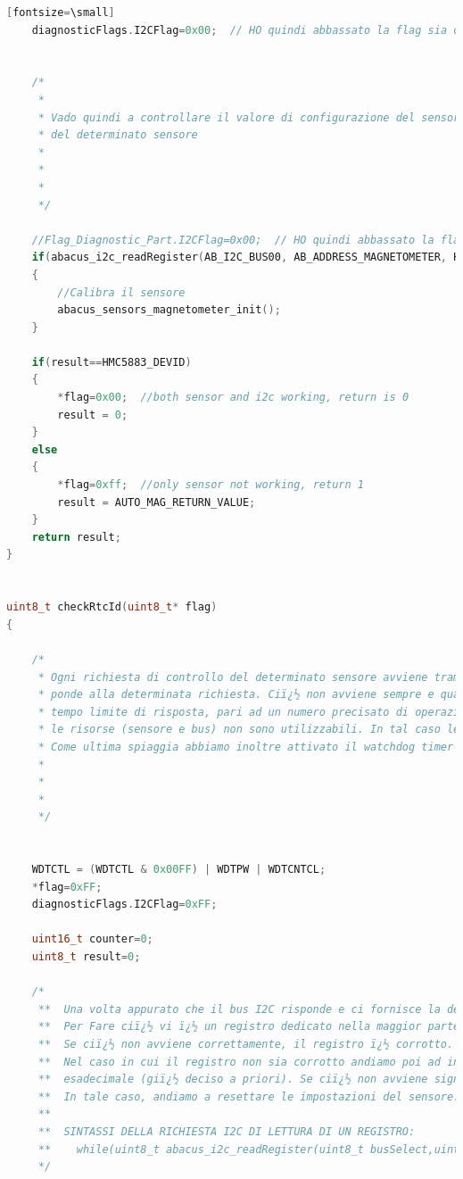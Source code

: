 \documentclass[LaM,binding=0.6cm]{../sapthesis}
\begin{document}
\begin{lstlisting}[language=c][fontsize=\small]
    diagnosticFlags.I2CFlag=0x00;  // HO quindi abbassato la flag sia del sensore che del bus


    /*
     *
     * Vado quindi a controllare il valore di configurazione del sensore, se ciï¿½ non va bene, richiamo la funzione di calibrazione
     * del determinato sensore
     *
     *
     *
     */

    //Flag_Diagnostic_Part.I2CFlag=0x00;  // HO quindi abbassato la flag sia del sensore che del bus
    if(abacus_i2c_readRegister(AB_I2C_BUS00, AB_ADDRESS_MAGNETOMETER, HMC5883MODEREG)!=HMC5883_STD_CONFIG)
    {
        //Calibra il sensore
        abacus_sensors_magnetometer_init();
    }

    if(result==HMC5883_DEVID)
    {
        *flag=0x00;  //both sensor and i2c working, return is 0
        result = 0;
    }
    else
    {
        *flag=0xff;  //only sensor not working, return 1
        result = AUTO_MAG_RETURN_VALUE;
    }
    return result;
}


uint8_t checkRtcId(uint8_t* flag)
{

    /*
     * Ogni richiesta di controllo del determinato sensore avviene tramite protocollo I2C. Questo protocollo si svolge in due parti: prima si richiede la determinata risorsa, poi il sensore ris
     * ponde alla determinata richiesta. Ciï¿½ non avviene sempre e qualcosa puï¿½ andare storto (sensore rotto, bus I2C non funzionante). Per evitare che il codice si blocchi imponiamo quindi un
     * tempo limite di risposta, pari ad un numero precisato di operazioni. Se il contatore raggiunge il limite, significa che il bus non risponde e di conseguenza bisogna supporre che entrambe
     * le risorse (sensore e bus) non sono utilizzabili. In tal caso le flag a byte rimangono alte e dopo un software reset obbligato le risorse vengono escluse o il problema viene risolto.
     * Come ultima spiaggia abbiamo inoltre attivato il watchdog timer che ci permette di non bloccare il codice nel caso in cui tutta la procedura venga bloccata da un evento inaspettato.
     *
     *
     *
     */


    WDTCTL = (WDTCTL & 0x00FF) | WDTPW | WDTCNTCL;
    *flag=0xFF;
    diagnosticFlags.I2CFlag=0xFF;

    uint16_t counter=0;
    uint8_t result=0;

    /*
     **  Una volta appurato che il bus I2C risponde e ci fornisce la determinata risorsa, bisogna valutare che i registri non siano corrotti.
     **  Per Fare ciï¿½ vi ï¿½ un registro dedicato nella maggior parte dei sensori chiamato "Device ID" che ci permette di leggere il nome del sensore.
     **  Se ciï¿½ non avviene correttamente, il registro ï¿½ corrotto.
     **  Nel caso in cui il registro non sia corrotto andiamo poi ad indagare il registro di configurazione, il quale deve essere impostato secondo un determinato valore
     **  esadecimale (giï¿½ deciso a priori). Se ciï¿½ non avviene significa che qualcosa ï¿½ cambiato e ciï¿½ ï¿½ inaspettato.
     **  In tale caso, andiamo a resettare le impostazioni del sensore.
     **
     **  SINTASSI DELLA RICHIESTA I2C DI LETTURA DI UN REGISTRO:
     **    while(uint8_t abacus_i2c_readRegister(uint8_t busSelect,uint8_t address, uint8_t reg)
     */


\end{lstlisting}
\end{document}

